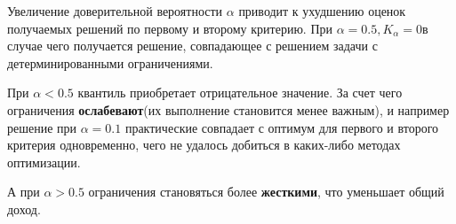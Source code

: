 Увеличение доверительной вероятности $\alpha$ приводит к ухудшению оценок получаемых решений по первому и второму критерию. При $\alpha = 0.5, K_{\alpha} = 0$в случае чего получается решение, совпадающее с решением задачи с детерминированными ограничениями. 

При $\alpha < 0.5$ квантиль приобретает отрицательное значение. За счет чего ограничения \textbf{ослабевают}(их выполнение становится менее важным), и например решение при $\alpha = 0.1$ практические совпадает с оптимум для первого и второго критерия одновременно, чего не удалось добиться в каких-либо методах оптимизации.

А при $\alpha > 0.5$ ограничения становяться более \textbf{жесткими}, что уменьшает общий доход.
